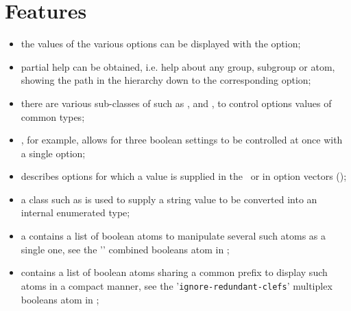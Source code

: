 %


\section{Features}

\begin{itemize}
\item the values of the various options can be displayed with the  option;

\item partial help can be obtained, i.e. help about any group, subgroup or atom,
    showing the path in the hierarchy down to the corresponding option;

\item there are various sub-classes of  such as , 
    and , to control options values of common types;

\item {}, for example, allows for three boolean settings
    to be controlled at once with a single option;

\item {} describes options for which a value is supplied
    in the \CLI\ or in option vectors (\API);

\item a class   such as  is used
    to supply a string value to be converted into an internal enumerated type;

\item a  contains a list of boolean atoms
    to manipulate several such atoms as a single one,
    see the '' combined booleans atom in ;

\item {} contains a list of boolean atoms
    sharing a common prefix to display such atoms in a compact manner,
    see the '{\tt ignore-redundant-clefs}' multiplex booleans atom in ;


\end{itemize}
